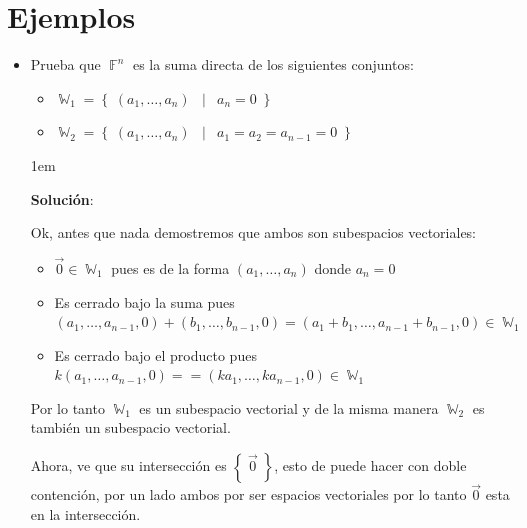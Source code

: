 \documentclass[12pt, fleqn]{report}                             %
\newenvironment{SmallIndentation}[1][0.75em]                    %
        {\begin{adjustwidth}{#1}{}\begin{footnotesize}}             %
        {\end{footnotesize}\end{adjustwidth}}                       %
\DeclareMathOperator \Space     {\quad}                         %
\DeclareMathOperator \MiniSpace {\;}                            %
\newcommand \Such           {\MiniSpace | \MiniSpace}           %
\theoremstyle{break}                                            %
\DeclareMathOperator \GenericField {\mathbb{F}}                 %
\DeclareMathOperator \SubVectorSet {\mathbb{W}}                 %
\newcommand{\Set}[1]            {\left\{ \; #1 \; \right\}}     %
\begin{document}
        \section{Ejemplos}

            \begin{itemize}
                
                \item 
                    Prueba que $\GenericField^n$ es la suma directa de los siguientes
                    conjuntos:
                    \begin{itemize}
                        \item $\SubVectorSet_1 = \Set{(a_1, \dots, a_n) \Such a_n = 0}$
                        \item $\SubVectorSet_2 = \Set{(a_1, \dots, a_n) \Such a_1 = a_2 = a_{n-1} = 0}$
                    \end{itemize}


                    \begin{SmallIndentation}[1em]
                        \textbf{Solución}:

                        Ok, antes que nada demostremos que ambos son subespacios vectoriales:
                        \begin{itemize}
                            \item $\vec 0 \in \SubVectorSet_1$ pues es de la forma $(a_1, \dots, a_n)$ donde
                                $a_n = 0$
                            \item Es cerrado bajo la suma pues
                                $(a_1, \dots, a_{n-1}, 0) + (b_1, \dots, b_{n-1}, 0) 
                                    = (a_1+b_1, \dots, a_{n-1}+b_{n-1}, 0)
                                    \in \SubVectorSet_1$

                            \item Es cerrado bajo el producto pues
                                $k(a_1, \dots, a_{n-1}, 0) = = (ka_1, \dots, ka_{n-1}, 0)
                                    \in \SubVectorSet_1$
                        \end{itemize}

                        Por lo tanto $\SubVectorSet_1$ es un subespacio vectorial y de la misma
                        manera $\SubVectorSet_2$ es también un subespacio vectorial.

                        Ahora, ve que su intersección es $\Set{\vec 0}$, esto de puede hacer
                        con doble contención, por un lado ambos por ser espacios vectoriales
                        por lo tanto $\vec 0$ esta en la intersección.


\end{SmallIndentation}
\end{itemize}
\end{document}
